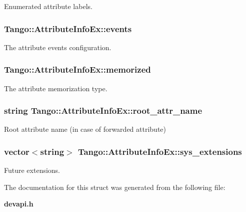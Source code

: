 Enumerated attribute labels. 

\subsubsection[{events}]{ Tango\-::\-Attribute\-Info\-Ex\-::events}\label{structTango_1_1AttributeInfoEx_a57d8d88a07dac398a91ad4180d7cb6c8}


The attribute events configuration. 

\subsubsection[{memorized}]{ Tango\-::\-Attribute\-Info\-Ex\-::memorized}\label{structTango_1_1AttributeInfoEx_a60e3af52cd117f6c05f3408124caa4ce}


The attribute memorization type. 

\subsubsection[{root\-\_\-attr\-\_\-name}]{\setlength{\rightskip}{0pt plus 5cm}string Tango\-::\-Attribute\-Info\-Ex\-::root\-\_\-attr\-\_\-name}\label{structTango_1_1AttributeInfoEx_a9b125948c23b7a7747ad16165625ab66}


Root attribute name (in case of forwarded attribute) 

\subsubsection[{sys\-\_\-extensions}]{\setlength{\rightskip}{0pt plus 5cm}vector$<$string$>$ Tango\-::\-Attribute\-Info\-Ex\-::sys\-\_\-extensions}\label{structTango_1_1AttributeInfoEx_afdf808e107b2d36d75eb8e07d798d7b4}


Future extensions. 



The documentation for this struct was generated from the following file\-:\begin{DoxyCompactItemize}
\item 
{\bf devapi.\-h}\end{DoxyCompactItemize}
